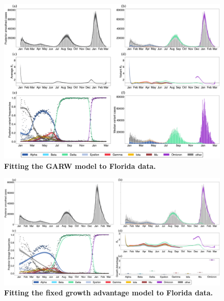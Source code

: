 \begin{figure}
  \centering
  \includegraphics[width=\linewidth]{figs/GARW_rt_Florida.png}
  \caption{\textbf{Fitting the GARW model to Florida data.}}%
  \label{fig:GARW_rt_Florida}
\end{figure}

\begin{figure}
  \centering
  \includegraphics[width=\linewidth]{figs/fixed_growth_Florida.png}
  \caption{\textbf{Fitting the fixed growth advantage model to Florida data.}}%
  \label{fig:fixed_growth_Florida}
\end{figure}

